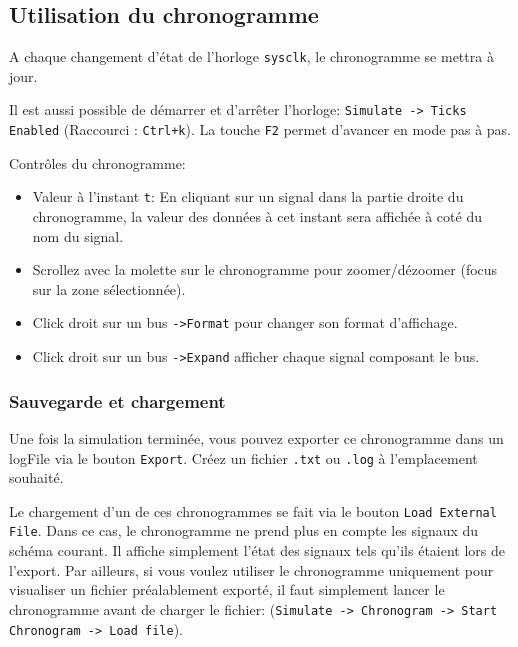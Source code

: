\documentclass[nosolution]{exercice}
\begin{document}
\subsection{Utilisation du chronogramme}
A chaque changement d'état de l'horloge \texttt{sysclk}, le chronogramme se mettra à jour.

Il est aussi possible de démarrer et d'arrêter l'horloge: \texttt{Simulate -> Ticks Enabled} (Raccourci :
\texttt{Ctrl+k}). La touche \texttt{F2} permet d'avancer en mode pas à pas.

Contrôles du chronogramme:
\begin{itemize}
    \item Valeur à l'instant \texttt{t}: En cliquant sur un signal dans la partie droite du chronogramme, la valeur des
        données à cet instant sera affichée à coté du nom du signal.
    \item Scrollez avec la molette sur le chronogramme pour zoomer/dézoomer (focus sur la zone sélectionnée).
    \item Click droit sur un bus \texttt{->Format} pour changer son format d'affichage.
    \item Click droit sur un bus \texttt{->Expand} afficher chaque signal composant le bus.
\end{itemize}

\subsubsection{Sauvegarde et chargement}
Une fois la simulation terminée, vous pouvez exporter ce chronogramme dans un logFile via le bouton \texttt{Export}.
Créez un fichier \texttt{.txt} ou \texttt{.log} à l'emplacement souhaité.

Le chargement d'un de ces chronogrammes se fait via le bouton \texttt{Load External File}. Dans ce cas, le chronogramme
ne prend plus en compte les signaux du schéma courant. Il affiche simplement l'état des signaux tels qu'ils étaient lors
de l'export. Par ailleurs, si vous voulez utiliser le chronogramme uniquement pour visualiser un fichier préalablement
exporté, il faut simplement lancer le chronogramme avant de charger le fichier:
(\texttt{Simulate -> Chronogram -> Start Chronogram -> Load file}).
\end{document}

